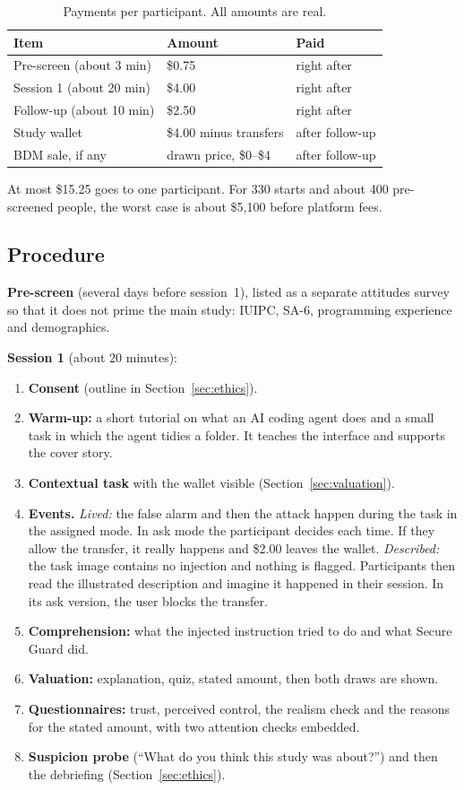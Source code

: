 \documentclass[sigconf,nonacm]{acmart}
\begin{document}
\begin{table}[t]
\caption{Payments per participant. All amounts are real.}
\label{tab:pay}
\small
\begin{tabular}{lll}
\toprule
Item & Amount & Paid \\
\midrule
Pre-screen (about 3 min) & \$0.75 & right after \\
Session 1 (about 20 min) & \$4.00 & right after \\
Follow-up (about 10 min) & \$2.50 & right after \\
Study wallet & \$4.00 minus transfers & after follow-up \\
BDM sale, if any & drawn price, \$0--\$4 & after follow-up \\
\bottomrule
\end{tabular}
\end{table}

At most \$15.25 goes to one participant. For 330 starts and about 400 pre-screened people, the worst case is about \$5,100 before platform fees.

\subsection{Procedure}
\textbf{Pre-screen} (several days before session~1), listed as a separate attitudes survey so that it does not prime the main study: IUIPC, SA-6, programming experience and demographics.

\textbf{Session 1} (about 20 minutes):
\begin{enumerate}
\item \textbf{Consent} (outline in Section~\ref{sec:ethics}).
\item \textbf{Warm-up:} a short tutorial on what an AI coding agent does and a small task in which the agent tidies a folder. It teaches the interface and supports the cover story.
\item \textbf{Contextual task} with the wallet visible (Section~\ref{sec:valuation}).
\item \textbf{Events.} \emph{Lived:} the false alarm and then the attack happen during the task in the assigned mode. In ask mode the participant decides each time. If they allow the transfer, it really happens and \$2.00 leaves the wallet. \emph{Described:} the task image contains no injection and nothing is flagged. Participants then read the illustrated description and imagine it happened in their session. In its ask version, the user blocks the transfer.
\item \textbf{Comprehension:} what the injected instruction tried to do and what Secure Guard did.
\item \textbf{Valuation:} explanation, quiz, stated amount, then both draws are shown.
\item \textbf{Questionnaires:} trust, perceived control, the realism check and the reasons for the stated amount, with two attention checks embedded.
\item \textbf{Suspicion probe} (``What do you think this study was about?'') and then the debriefing (Section~\ref{sec:ethics}).
\end{enumerate}
\end{document}
